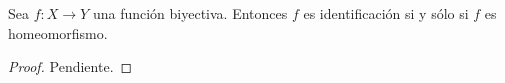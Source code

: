 

\begin{proposition}
Sea $f : X \longrightarrow Y$ una función biyectiva. Entonces $f$ es identificación si y sólo si $f$ es homeomorfismo.
\end{proposition}

\begin{proof}
Pendiente.
\end{proof}

